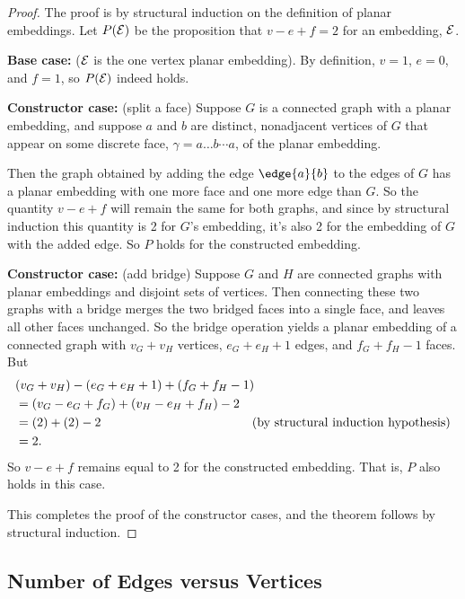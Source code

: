 \begin{proof}
The proof is by structural induction on the definition of planar
embeddings.  Let $P(\mathcal{E})$ be the proposition that $v - e + f = 2$ for an
embedding, $\mathcal{E}$.

\textbf{Base case:} ($\mathcal{E}$ is the one vertex planar embedding).
By definition, $v=1$, $e=0$, and $f=1$, so $P(\mathcal{E})$ indeed holds.

\textbf{Constructor case:} (split a face) Suppose $G$ is a connected graph
with a planar embedding, and suppose $a$ and $b$ are distinct, nonadjacent
vertices of $G$ that appear on some discrete face,
$\gamma= a \dots b \cdots a$, of the planar embedding.

Then the graph obtained by adding the edge $\edge{a}{b}$ to the edges of
$G$ has a planar embedding with one more face and one more edge than $G$.
So the quantity $v-e+f$ will remain the same for both graphs, and since by
structural induction this quantity is 2 for $G$'s embedding, it's also 2
for the embedding of $G$ with the added edge.  So $P$ holds for the
constructed embedding.

\textbf{Constructor case:} (add bridge) Suppose $G$ and $H$ are connected
graphs with planar embeddings and disjoint sets of vertices.  Then
connecting these two graphs with a bridge merges the two bridged faces
into a single face, and leaves all other faces unchanged.  So the bridge
operation yields a planar embedding of a connected graph with $v_G +v_H$
vertices, $e_G + e_H +1$ edges, and $f_G + f_H - 1$ faces.  But
\begin{align*}
\lefteqn{(v_G +v_H) - (e_G + e_H +1) + (f_G + f_H - 1)}\\
   & = (v_G  - e_G + f_G) + (v_H  - e_H  + f_H) -2\\
   & = (2)+(2)-2 & \text{(by structural induction hypothesis)}\\
   & = 2.
\end{align*}
So $v-e+f$ remains equal to 2 for the constructed embedding.  That is, $P$
also holds in this case.

This completes the proof of the constructor cases, and the theorem follows
by structural induction.
\end{proof}

\subsection{Number of Edges versus Vertices}

